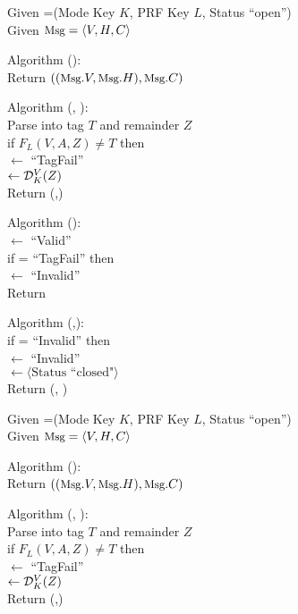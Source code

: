 \begin{figure}
{
Given =(Mode Key $K$, PRF Key $L$, Status
``open'') \\
Given $\textrm{\small Msg} =\langle V,H,C \rangle$

\medskip
Algorithm ():\\
\nudge Return $\left((\textrm{\small Msg}.V,\textrm{\small Msg}.H),\textrm{\small Msg}.C\right)$

\medskip
Algorithm (, ):\\
\nudge Parse  into tag $T$ and remainder $Z$\\ 
\nudge if $F_L(V,A,Z) \neq T$ then\\
\nudge\nudge {} $\gets$ ``TagFail''\\
\nudge{} $\gets \mathcal{D}_K^{V}(Z)$\\
\nudge Return (,)

\medskip
Algorithm ():\\
\nudge {} $\gets$ ``Valid''\\
\nudge if  =  ``TagFail'' then\\ 
\nudge\nudge {} $\gets$ ``Invalid''\\
\nudge Return 

\medskip
Algorithm (,):\\
\nudge if  = ``Invalid'' then \\
\nudge\nudge {} $\gets$ ``Invalid'' \\
\nudge\nudge {} $\gets \langle
\mbox{Status ``closed"} \rangle$\\
\nudge Return (, )
}
{
Given =(Mode Key $K$, PRF Key $L$, Status
``open'') \\
Given $\textrm{\small Msg} =\langle V,H,C \rangle$

\medskip
Algorithm ():\\
\nudge Return $\left((\textrm{\small Msg}.V, \textrm{\small Msg}.H),\textrm{\small Msg}.C\right)$

\medskip
Algorithm (, ):\\
\nudge Parse  into tag $T$ and remainder $Z$\\ 
\nudge if $F_L(V,A,Z) \neq T$ then\\
\nudge\nudge {} $\gets$ ``TagFail''\\
\nudge{} $\gets \mathcal{D}_K^{V}(Z)$\\
\nudge Return (,)

}
\end{figure}
